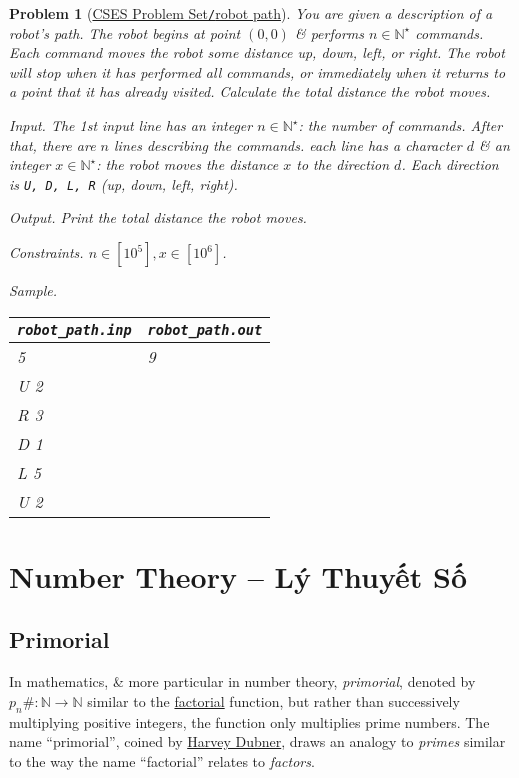 \documentclass{article}
\newtheorem{problem}{Problem}
\begin{document}
\begin{problem}[\href{https://cses.fi/problemset/task/1742}{CSES Problem Set{\tt/}robot path}]
    You are given a description of a robot's path. The robot begins at point $(0,0)$ \& performs $n\in\mathbb{N}^\star$ commands. Each command moves the robot some distance up, down, left, or right. The robot will stop when it has performed all commands, or immediately when it returns to a point that it has already visited. Calculate the total distance the robot moves.
    \item {\sf Input.} The 1st input line has an integer $n\in\mathbb{N}^\star$: the number of commands. After that, there are $n$ lines describing the commands. each line has a character $d$ \& an integer $x\in\mathbb{N}^\star$: the robot moves the distance $x$ to the direction $d$. Each direction is {\tt U, D, L, R} (up, down, left, right).
    \item {\sf Output.} Print the total distance the robot moves.
    \item {\sf Constraints.} $n\in[10^5],x\in[10^6]$.
    \item {\sf Sample.}
    \begin{table}[H]
        \centering
        \begin{tabular}{|l|l|}
            \hline
            \verb|robot_path.inp| & \verb|robot_path.out| \\
            \hline
            5 & 9 \\
            U 2 & \\
            R 3 & \\
            D 1 & \\
            L 5 & \\
            U 2 & \\
            \hline
        \end{tabular}
    \end{table}
\end{problem}


\section{Number Theory -- Lý Thuyết Số}


\subsection{Primorial}
In mathematics, \& more particular in number theory, {\it primorial}, denoted by $p_n\#:\mathbb{N}\to\mathbb{N}$ similar to the \href{https://en.wikipedia.org/wiki/Factorial}{factorial} function, but rather than successively multiplying positive integers, the function only multiplies prime numbers. The name ``primorial'', coined by \href{https://en.wikipedia.org/wiki/Harvey_Dubner}{\sc Harvey Dubner}, draws an analogy to {\it primes} similar to the way the name ``factorial'' relates to {\it factors}.
\end{document}
